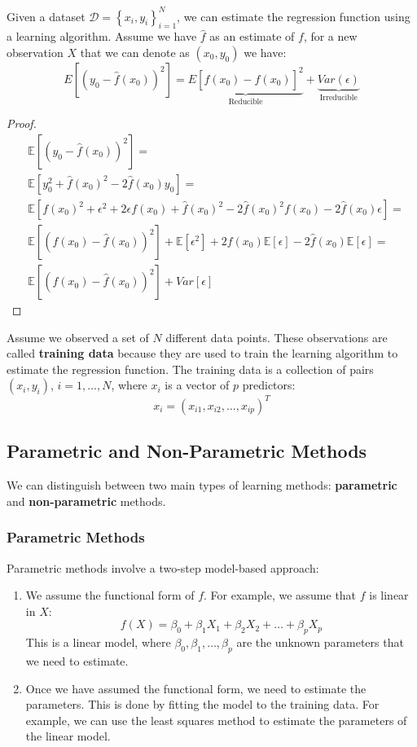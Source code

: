 Given a dataset $\mathcal{D} = \left\{ x_i, y_i \right\}_{i=1}^{N}$, we can estimate the regression function using a learning algorithm. Assume we have $\hat{f}$ as an estimate of $f$, for a new observation $X$ that we can denote as $(x_0, y_0)$ we have:
\[
    E[(y_0-\hat f(x_0))^2]=\underbrace{E[f(x_0)-\hat f(x_0)]^2}_{\text{Reducible}}+\underbrace{Var(\epsilon)}_{\text{Irreducible}}
\]
\begin{proof}
    \begin{align*}
        &\mathbb E[(y_0-\hat f(x_0))^2]=\\
        &\mathbb E [y_0^2+\hat f(x_0)^2-2\hat f(x_0)y_0]=\\
        &\mathbb E[f(x_0)^2+\epsilon^2+2\epsilon f(x_0)+\hat f(x_0)^2 -2\hat f(x_0)^2f(x_0)-2\hat f(x_0)\epsilon]=\\
        &\mathbb E[(f(x_0)-\hat f(x_0))^2]+\mathbb E[\epsilon^2]+{2f(x_0)\mathbb E[\epsilon]}-{2\hat f(x_0)\mathbb E[\epsilon]}=\\
        &\mathbb E[(f(x_0)-\hat f(x_0))^2]+Var[\epsilon]    
    \end{align*}
    
\end{proof}

Assume we observed a set of $N$ different data points. These observations are called \textbf{training data} because they are used to train the learning algorithm to estimate the regression function. The training data is a collection of pairs $(x_i, y_i)$, $i=1,\dots,N$, where $x_i$ is a vector of $p$ predictors:
\[
  x_i = (x_{i1}, x_{i2}, \dots, x_{ip})^T  
\]

\subsection*{Parametric and Non-Parametric Methods}
We can distinguish between two main types of learning methods: \textbf{parametric} and \textbf{non-parametric} methods.
\subsubsection*{Parametric Methods}
Parametric methods involve a two-step model-based approach:
\begin{enumerate}
    \item We assume the functional form of $f$. For example, we assume that $f$ is linear in $X$:
          \[
              f(X) = \beta_0 + \beta_1 X_1 + \beta_2 X_2 + \dots + \beta_p X_p
          \]
          This is a linear model, where $\beta_0, \beta_1, \dots, \beta_p$ are the unknown parameters that we need to estimate.
    \item Once we have assumed the functional form, we need to estimate the parameters. This is done by fitting the model to the training data. For example, we can use the least squares method to estimate the parameters of the linear model.
\end{enumerate}

